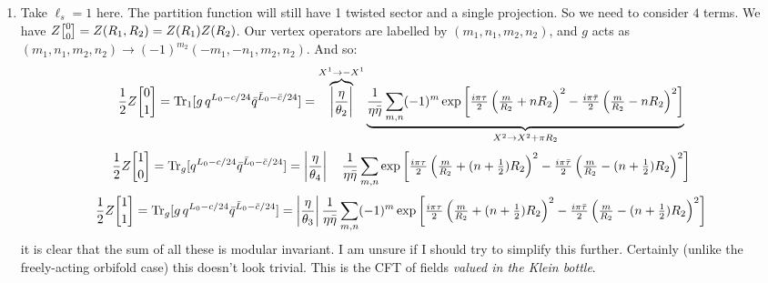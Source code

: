 \documentclass[11pt]{article}
\begin{document}
\begin{enumerate}
	\item Take $\ell_s = 1$ here. The partition function will still have 1 twisted sector and a single projection. So we need to consider $4$ terms. We have $Z\twist00 = Z(R_1, R_2) = Z(R_1) Z(R_2)$. Our vertex operators are labelled by $(m_1, n_1, m_2, n_2)$, and $g$ acts as $(m_1, n_1, m_2, n_2) \to (-1)^{m_2} (-m_1, -n_1, m_2, n_2)$. And so:
	\[
		\frac12 Z\twist01 = \mathrm{Tr}_1[g\, q^{L_0 - c/24} \bar q^{\bar L_0 - \bar c/24}] = \overbrace{\left|\frac{\eta}{\theta_2}\right|}^{X^1 \to -X^1}
		 \underbrace{\frac{1}{\eta \bar \eta}\sum_{m, n} (-1)^m \exp\left[\tfrac{i \pi \tau}{2} \left( \tfrac{m}{R_2} + n R_2 \right)^2 - \tfrac{i \pi \bar \tau}{2} \left( \tfrac{m}{R_2} - n R_2 \right)^2  \right] }_{X^2 \to X^2 + \pi R_2}
	\]
	\[
		\frac12 Z\twist10 = \mathrm{Tr}_g[q^{L_0 - c/24} \bar q^{\bar L_0 - \bar c/24}] = \left|\frac{\eta}{\theta_4}\right| \quad \frac{1}{\eta \bar \eta}\sum_{m, n} \exp\left[\tfrac{i \pi \tau}{2} \left( \tfrac{m}{R_2} + (n + \tfrac12) R_2 \right)^2 - \tfrac{i \pi \bar \tau}{2} \left( \tfrac{m}{R_2} - (n + \tfrac12) R_2 \right)^2  \right]
	\]
	\[
		\frac12 Z\twist11 = \mathrm{Tr}_g[g\, q^{L_0 - c/24} \bar q^{\bar L_0 - \bar c/24}] = \left|\frac{\eta}{\theta_3}\right| \frac{1}{\eta \bar \eta}\sum_{m, n} (-1)^m \exp\left[\tfrac{i \pi \tau}{2} \left( \tfrac{m}{R_2} + (n + \tfrac12) R_2 \right)^2 - \tfrac{i \pi \bar \tau}{2} \left( \tfrac{m}{R_2} - (n + \tfrac12) R_2 \right)^2  \right]
	\]
	it is clear that the sum of all these is modular invariant. I am unsure if I should try to simplify this further. Certainly (unlike the freely-acting orbifold case) this doesn't look trivial. This is the CFT of fields \emph{valued in the Klein bottle}.
	

\end{enumerate}
\end{document}
